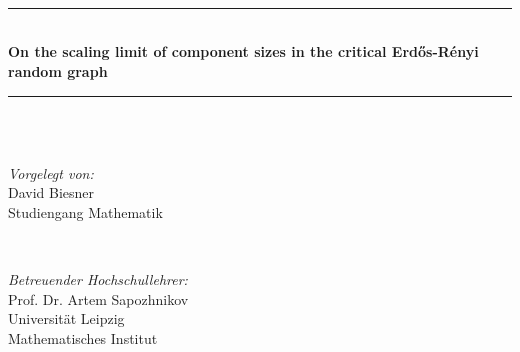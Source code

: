 \begin{titlepage}

\newcommand{\HRule}{\rule{\linewidth}{0.1mm}} %

\center %
 

\\[0.2cm] %
\\[0.2cm] %
\\[0.2cm] %


\HRule \\[0.4cm]
{ \huge \bfseries On the scaling limit of component sizes in the critical Erd\H os-Rényi random graph}\\[0.4cm] %
\HRule \\[1cm]

 

\\[2cm] %


\begin{minipage}{\textwidth}
\begin{flushleft} \large
\emph{Vorgelegt von:}\\
David Biesner \\
Studiengang Mathematik %
\end{flushleft}
\end{minipage}\\[1cm]

\begin{minipage}{\textwidth}
\begin{flushleft} \large
\emph{Betreuender Hochschullehrer:} \\
Prof. Dr. Artem Sapozhnikov \\
Universität Leipzig \\
Mathematisches Institut %
\end{flushleft}
\end{minipage}\\[7cm]


\end{titlepage}
